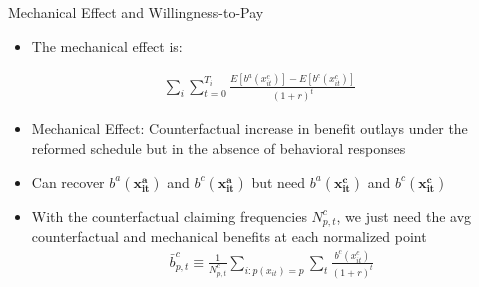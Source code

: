 
\begin{frame}[label=MEandFE]{Mechanical Effect and Willingness-to-Pay}
    \begin{itemize}
        \item The mechanical effect is:
    \end{itemize}
    {\small
    \begin{align*}
         \sum_i \sum_{t=0}^{T_i} \frac{E[b^a(x^c_{it})]-E[b^c(x_{it}^c)]}{(1+r)^t}
    \end{align*}
    }
    \begin{itemize}
        \item Mechanical Effect: Counterfactual increase in benefit outlays under the reformed schedule but in the absence of behavioral responses
        \item Can recover $b^a(\mathbf{x_{it}^a})$ and $b^c(\mathbf{x_{it}^a})$ but need $b^a(\mathbf{x_{it}^c})$ and $b^c(\mathbf{x_{it}^c})$
        \item With the counterfactual claiming frequencies $N^c_{p,t}$, we just need the avg counterfactual and mechanical benefits at each normalized point
        \begin{align*}
            \bar b^c_{p,t} \equiv \frac{1}{N_{p,t}^c}\sum_{i:p(x_{it})=p}\sum_t \frac{b^c(x_{it}^c)}{(1+r)^t}
        \end{align*}
    \end{itemize}
\end{frame}

